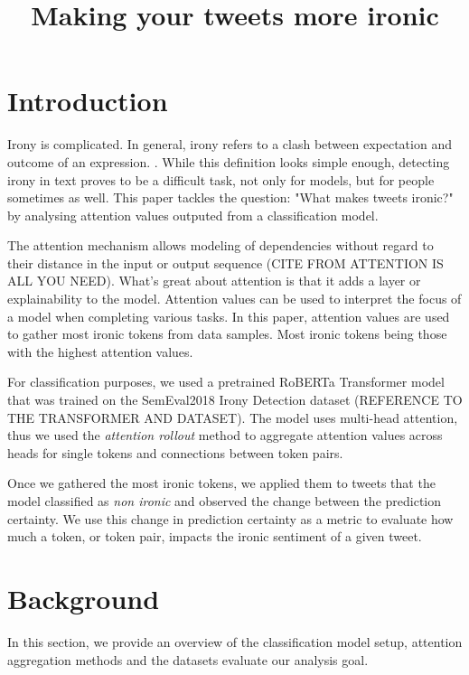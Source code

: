\documentclass[10pt, a4paper]{article}
\title{Making your tweets more ironic}
\begin{document}
\maketitleabstract

\section{Introduction}

Irony is complicated.
In general, irony refers to a clash between expectation and outcome of an expression. \citep{kreutz-20}. 
While this definition looks simple enough, detecting irony in text proves to be a difficult task, not only for models, but for people sometimes as well.
This paper tackles the question: "What makes tweets ironic?" by analysing attention values outputed from a classification model.

The attention mechanism allows modeling of dependencies without regard to their distance in the input or output sequence (CITE FROM ATTENTION IS ALL YOU NEED).
What's great about attention is that it adds a layer or explainability to the model. Attention values can be used to interpret the focus of a model when completing various tasks.
In this paper, attention values are used to gather most ironic tokens from data samples. Most ironic tokens being those with the highest attention values.

For classification purposes, we used a pretrained RoBERTa Transformer model that was trained on the SemEval2018 Irony Detection dataset (REFERENCE TO THE TRANSFORMER AND DATASET).
The model uses multi-head attention, thus we used the \textit{attention rollout} method to aggregate attention values across heads for single tokens and connections between token pairs.

Once we gathered the most ironic tokens, we applied them to tweets that the model classified as \textit{non ironic} and observed the change between the prediction certainty.
We use this change in prediction certainty as a metric to evaluate how much a token, or token pair, impacts the ironic sentiment of a given tweet.

\section{Background}

In this section, we provide an overview of the classification model setup, attention aggregation methods and the datasets evaluate our analysis goal.
\end{document}
